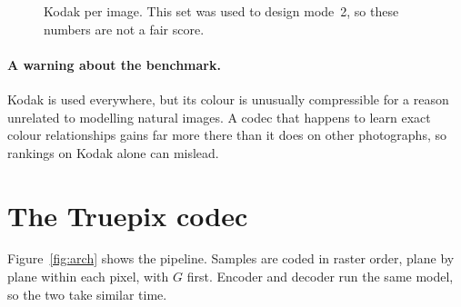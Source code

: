 \documentclass[10pt,twocolumn]{article}
\begin{document}
\begin{figure}[t]
\centering
{}
\caption{Kodak per image. This set was used to design mode~2, so these numbers are not a fair score.}
\label{fig:kodak}
\end{figure}

\paragraph{A warning about the benchmark.}
Kodak is used everywhere, but its colour is unusually compressible for a reason unrelated to modelling natural images. A codec that happens to learn exact colour relationships gains far more there than it does on other photographs, so rankings on Kodak alone can mislead.

\section{The Truepix codec}

Figure~\ref{fig:arch} shows the pipeline. Samples are coded in raster order, plane by plane within each pixel, with $G$ first. Encoder and decoder run the same model, so the two take similar time.
\end{document}
